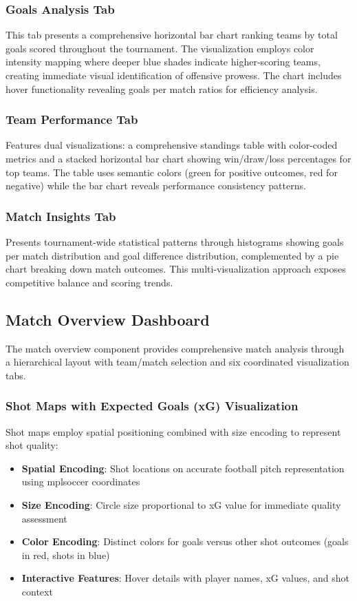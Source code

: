 \documentclass[12pt,a4paper]{article}
\begin{document}
\subsubsection{Goals Analysis Tab}
This tab presents a comprehensive horizontal bar chart ranking teams by total goals scored throughout the tournament. The visualization employs color intensity mapping where deeper blue shades indicate higher-scoring teams, creating immediate visual identification of offensive prowess. The chart includes hover functionality revealing goals per match ratios for efficiency analysis.


\subsubsection{Team Performance Tab}
Features dual visualizations: a comprehensive standings table with color-coded metrics and a stacked horizontal bar chart showing win/draw/loss percentages for top teams. The table uses semantic colors (green for positive outcomes, red for negative) while the bar chart reveals performance consistency patterns.


\subsubsection{Match Insights Tab}
Presents tournament-wide statistical patterns through histograms showing goals per match distribution and goal difference distribution, complemented by a pie chart breaking down match outcomes. This multi-visualization approach exposes competitive balance and scoring trends.



\subsection{Match Overview Dashboard}

The match overview component provides comprehensive match analysis through a hierarchical layout with team/match selection and six coordinated visualization tabs. 

\subsubsection{Shot Maps with Expected Goals (xG) Visualization}
Shot maps employ spatial positioning combined with size encoding to represent shot quality:
\begin{itemize}
    \item \textbf{Spatial Encoding}: Shot locations on accurate football pitch representation using mplsoccer coordinates
    \item \textbf{Size Encoding}: Circle size proportional to xG value for immediate quality assessment
    \item \textbf{Color Encoding}: Distinct colors for goals versus other shot outcomes (goals in red, shots in blue)
    \item \textbf{Interactive Features}: Hover details with player names, xG values, and shot context
\end{itemize}
\end{document}
